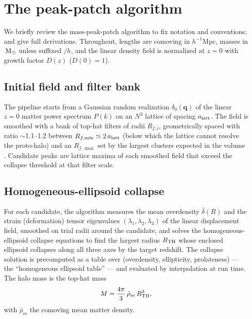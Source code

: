 \section{The peak-patch algorithm}
\label{sec:algorithm}

We briefly review the mass-peak-patch algorithm to fix notation and
conventions; \citet{BondMyers1996a} and \citet{Stein2019} give full
derivations. Throughout, lengths are comoving in $h^{-1}$Mpc, masses in
$\,\mathrm{M}_\odot$ unless suffixed $/h$, and the linear density field is normalized at
$z=0$ with growth factor $D(z)$ ($D(0)=1$).

\subsection{Initial field and filter bank}
\label{sec:algorithm-filters}

The pipeline starts from a Gaussian random realization $\delta_0(\bm{q})$ of
the linear $z=0$ matter power spectrum $P(k)$ on an $N^3$ lattice of spacing
$a_{\rm latt}$. The field is smoothed with a bank of top-hat filters of radii
$R_{f,i}$, geometrically spaced with ratio $\sim$1.1--1.2 between
$R_{f,\min}\simeq 2\,a_{\rm latt}$ (below which the lattice cannot resolve the
proto-halo) and an $R_{f,\max}$ set by the largest clusters expected in the
volume \citep[cf.][]{Stein2019}. Candidate peaks are lattice maxima of each
smoothed field that exceed the collapse threshold at that filter scale.

\subsection{Homogeneous-ellipsoid collapse}
\label{sec:algorithm-collapse}

For each candidate, the algorithm measures the mean overdensity
$\bar\delta(R)$ and the strain (deformation) tensor eigenvalues
$(\lambda_1,\lambda_2,\lambda_3)$ of the linear displacement field, smoothed
on trial radii around the candidate, and solves the homogeneous-ellipsoid
collapse equations to find the largest radius $R_{\rm TH}$ whose enclosed
ellipsoid collapses along all three axes by the target redshift. The collapse
solution is precomputed as a table over (overdensity, ellipticity,
prolateness) --- the ``homogeneous ellipsoid table'' --- and evaluated by
interpolation at run time. The halo mass is the top-hat mass
\begin{equation}
  M = \frac{4\pi}{3}\,\bar\rho_m\,R_{\rm TH}^3 ,
  \label{eq:mtophat}
\end{equation}
with $\bar\rho_m$ the comoving mean matter density.

